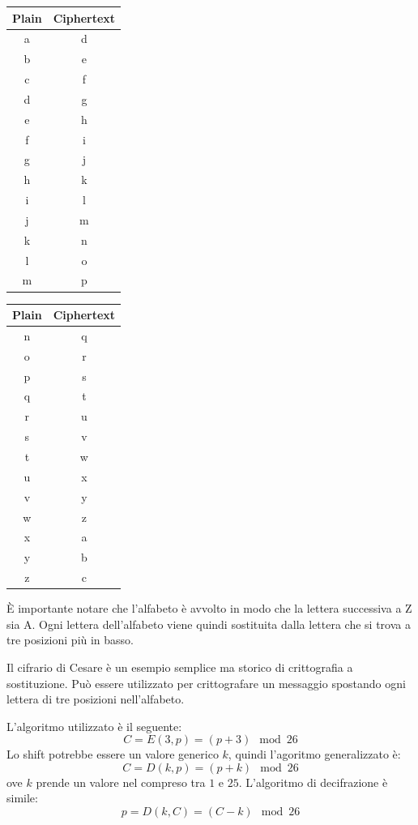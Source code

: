 \begin{center}
\begin{tabular}{|c|c|}
\hline
\textbf{Plain} & \textbf{Ciphertext} \\
\hline
a & d \\
b & e \\
c & f \\
d & g \\
e & h \\
f & i \\
g & j \\
h & k \\
i & l \\
j & m \\
k & n \\
l & o \\
m & p \\
\hline
\end{tabular}
\hspace{2cm}
\begin{tabular}{|c|c|}
\hline
\textbf{Plain} & \textbf{Ciphertext} \\
\hline
n & q \\
o & r \\
p & s \\
q & t \\
r & u \\
s & v \\
t & w \\
u & x \\
v & y \\
w & z \\
x & a \\
y & b \\
z & c \\
\hline
\end{tabular}
\end{center}

È importante notare che l'alfabeto è avvolto in modo che la lettera
successiva a Z sia A. Ogni lettera dell'alfabeto viene quindi sostituita
dalla lettera che si trova a tre posizioni più in basso.

Il cifrario di Cesare è un esempio semplice ma storico di crittografia a
sostituzione. Può essere utilizzato per crittografare un messaggio
spostando ogni lettera di tre posizioni nell'alfabeto.

L'algoritmo utilizzato è il seguente:
\[
C = E(3, p) = (p + 3)\mod 26  
\]
Lo shift potrebbe essere un valore generico $k$, quindi l'agoritmo generalizzato 
è:
\[
C = D(k, p) = (p + k)\mod 26  
\]
ove $k$ prende un valore nel compreso tra $1$ e $25$. L'algoritmo di 
decifrazione è simile:
\[
  p = D(k, C) = (C - k)\mod 26  
\]

